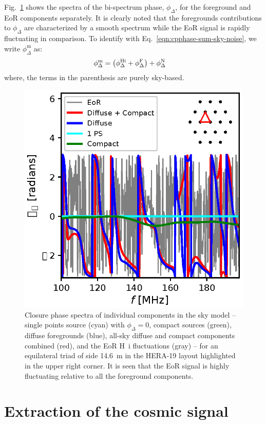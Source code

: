 \documentclass[
reprint,
superscriptaddress,
amsmath,
amssymb,
aps,
prd
]{revtex4-1}
\begin{document}
Fig.~\ref{fig:cp-spectra} shows the spectra of the bi-spectrum phase, $\phi_\Delta$, for the foreground and EoR components separately. It is clearly noted that the foregrounds contributions to $\phi_\Delta$ are characterized by a smooth spectrum while the EoR signal is rapidly fluctuating in comparison. To identify with Eq.~\ref{eqn:cpphase-sum-sky-noise}, we write $\phi_\Delta^\textrm{m}$ as:
\begin{align}\label{eqn:cp-components}
  \phi_\Delta^\textrm{m} &= \left(\phi_\Delta^\textrm{H{\sc i}} + \phi_\Delta^\textrm{F}\right) + \phi_\Delta^\textrm{N}
\end{align}
where, the terms in the parenthesis are purely sky-based. 

\begin{figure}[htb]
\includegraphics[width=0.85\linewidth]{closure_phase_spectra_1_15_16}
\caption{Closure phase spectra of individual components in the sky model -- single points source (cyan) with $\phi_\Delta=0$, compact sources (green), diffuse foregrounds (blue), all-sky diffuse and compact components combined (red), and the EoR H~{\sc i} fluctuations (gray) -- for an equilateral triad of side 14.6~m in the HERA-19 layout highlighted in the upper right corner. It is seen that the EoR signal is highly fluctuating relative to all the foreground components. \label{fig:cp-spectra}}
\end{figure}

\section{Extraction of the cosmic signal}\label{sec:extraction}
\end{document}
